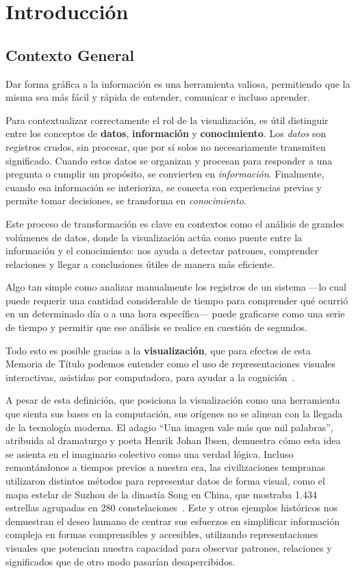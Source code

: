 \chapter{Introducción}
\section{Contexto General}

Dar forma gráfica a la información es una herramienta valiosa, permitiendo que la misma sea más fácil y rápida de entender, comunicar e incluso aprender.

Para contextualizar correctamente el rol de la visualización, es útil distinguir entre los conceptos de \textbf{datos}, \textbf{información} y \textbf{conocimiento}. Los \textit{datos} son registros crudos, sin procesar, que por sí solos no necesariamente transmiten significado. Cuando estos datos se organizan y procesan para responder a una pregunta o cumplir un propósito, se convierten en \textit{información}. Finalmente, cuando esa información se interioriza, se conecta con experiencias previas y permite tomar decisiones, se transforma en \textit{conocimiento}.

Este proceso de transformación es clave en contextos como el análisis de grandes volúmenes de datos, donde la visualización actúa como puente entre la información y el conocimiento: nos ayuda a detectar patrones, comprender relaciones y llegar a conclusiones útiles de manera más eficiente.

Algo tan simple como analizar manualmente los registros de un sistema —lo cual puede requerir una cantidad considerable de tiempo para comprender qué ocurrió en un determinado día o a una hora específica— puede graficarse como una serie de tiempo y permitir que ese análisis se realice en cuestión de segundos.

Todo esto es posible gracias a la \textbf{visualización}, que para efectos de esta Memoria de Título podemos entender como el uso de representaciones visuales interactivas, asistidas por computadora, para ayudar a la cognición~\cite{card1999readings}. 

A pesar de esta definición, que posiciona la visualización como una herramienta que sienta sus bases en la computación, sus orígenes no se alinean con la llegada de la tecnología moderna. El adagio ``Una imagen vale más que mil palabras'', atribuida al dramaturgo y poeta Henrik Johan Ibsen, demuestra cómo esta idea se asienta en el imaginario colectivo como una verdad lógica. Incluso remontándonos a tiempos previos a nuestra era, las civilizaciones tempranas utilizaron distintos métodos para representar datos de forma visual, como el mapa estelar de Suzhou de la dinastía Song en China, que mostraba 1.434 estrellas agrupadas en 280 constelaciones~\cite{bonnetbidaud2009dunhuang}. Este y otros ejemplos históricos nos demuestran el deseo humano de centrar sus esfuerzos en simplificar información compleja en formas comprensibles y accesibles, utilizando representaciones visuales que potencian nuestra capacidad para observar patrones, relaciones y significados que de otro modo pasarían desapercibidos.

